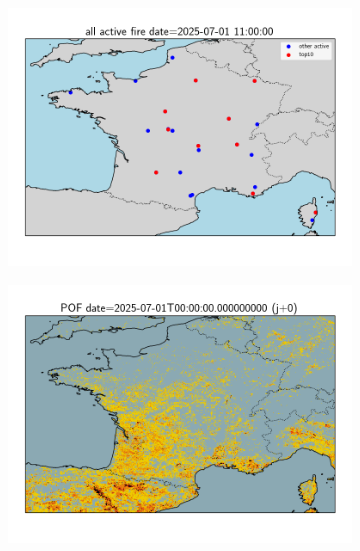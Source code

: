 \documentclass{article}
\begin{document}
\begin{figure}[H]
    \centering
    \begin{subfigure}[b]{0.455\textwidth}
        \centering
        \includegraphics[width=\linewidth]{general_scattterPlot.png} %
    \end{subfigure}
    \begin{subfigure}[b]{0.535\textwidth}
        \centering
        \includegraphics[width=0.85\linewidth]{general_pof_j0.png} %
    \end{subfigure}
\end{figure}
\end{document}

